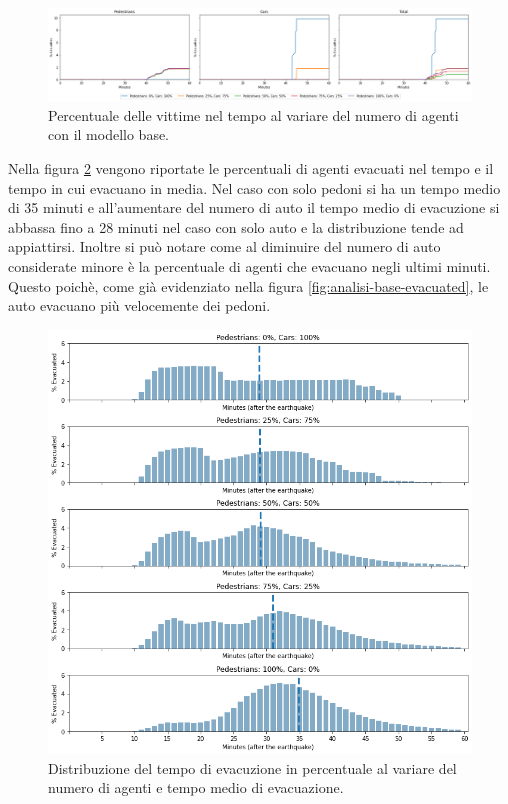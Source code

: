 \begin{figure}[ht]
    \centering
    \includegraphics[width=\textwidth]{images/analisi/base-casualties.png}
    \caption{
        Percentuale delle vittime nel tempo al variare del numero di agenti con il modello base.
    }
    \label{fig:analisi-base-casualties}
\end{figure}

Nella figura \ref{fig:analisi-base-evtimes} vengono riportate le percentuali di agenti evacuati nel tempo
e il tempo in cui evacuano in media.
%
Nel caso con solo pedoni si ha un tempo medio di 35 minuti
e all'aumentare del numero di auto il tempo medio di evacuzione si abbassa fino a 28 minuti nel caso con solo auto e 
la distribuzione tende ad appiattirsi.
Inoltre si può notare come al diminuire del numero di auto considerate minore è la percentuale di agenti che evacuano negli ultimi minuti.
Questo poichè, come già evidenziato nella figura \ref{fig:analisi-base-evacuated}, le auto evacuano più velocemente dei pedoni.

\begin{figure}
    \centering
    \includegraphics[width=\textwidth]{images/analisi/base-evtimes.png}
    \caption{
        Distribuzione del tempo di evacuzione in percentuale al variare del numero di agenti e tempo medio di evacuazione.
    }
    \label{fig:analisi-base-evtimes}
\end{figure}

